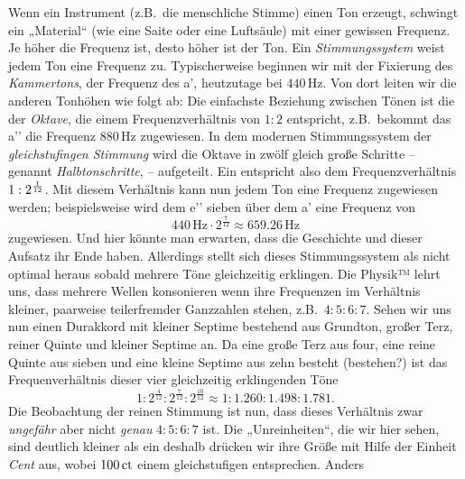 \documentclass[ngerman,11pt]{scrartcl}
\begin{document}
Wenn ein Instrument (z.B.\ die menschliche Stimme) einen Ton erzeugt, schwingt
ein „Material“ (wie eine Saite oder eine Luftsäule) mit einer gewissen Frequenz.
Je höher die Frequenz ist, desto höher ist der Ton. Ein \emph{Stimmungssystem}
weist jedem Ton eine Frequenz zu. Typischerweise beginnen wir mit der Fixierung
des \emph{Kammertons}, der Frequenz des a’, heutzutage bei $440$\,Hz. Von dort
leiten wir die anderen Tonhöhen wie folgt ab: Die einfachste Beziehung zwischen
Tönen ist die der \emph{Oktave}, die einem Frequenzverhältnis von $1:2$
entspricht, z.B.\ bekommt das a’’ die Frequenz $880$\,Hz zugewiesen. In dem
modernen Stimmungssystem der \emph{gleichstufingen Stimmung} wird die Oktave in
zwölf gleich große Schritte – genannt \emph{Halbtonschritte},  – 
aufgeteilt. Ein  entspricht also dem Frequenzverhältnis
$1:2^{\smash{\frac1{12}}}$. Mit diesem Verhältnis kann nun jedem Ton eine
Frequenz zugewiesen werden; beispielsweise wird dem e’’ sieben 
über dem a’ eine Frequenz von 
\[440\,\text{Hz}\cdot 2^{\frac7{12}} \approx 659.26\,\text{Hz}\] zugewiesen. Und
hier könnte man erwarten, dass die Geschichte und dieser Aufsatz ihr Ende
haben. Allerdings stellt sich dieses Stimmungssystem als nicht optimal heraus
sobald mehrere Töne gleichzeitig erklingen. Die Physik™ lehrt uns, dass mehrere
Wellen konsonieren wenn ihre Frequenzen im Verhältnis kleiner, paarweise
teilerfremder Ganzzahlen stehen, z.B.\ $4:5:6:7$. Sehen wir uns nun einen
Durakkord mit kleiner Septime bestehend aus Grundton, großer Terz, reiner Quinte
und kleiner Septime an. Da eine große Terz aus four, eine reine Quinte aus
sieben und eine kleine Septime aus zehn  besteht (bestehen?)
ist das Frequenverhältnis dieser vier gleichzeitig erklingenden Töne
\[1:2^{\frac4{12}}:2^{\frac7{12}}:2^{\frac{10}{12}}\approx
1:1.260:1.498:1.781.\]%
Die Beobachtung der reinen Stimmung ist nun, dass dieses Verhältnis zwar
\emph{ungefähr} aber nicht \emph{genau} $4:5:6:7$ ist.
Die „Unreinheiten“, die wir hier sehen, sind deutlich kleiner als ein
 deshalb drücken wir ihre Größe mit Hilfe der Einheit \emph{Cent} aus,
wobei $100\,\mathrm{ct}$ einem gleichstufigen  entsprechen. Anders
\end{document}
